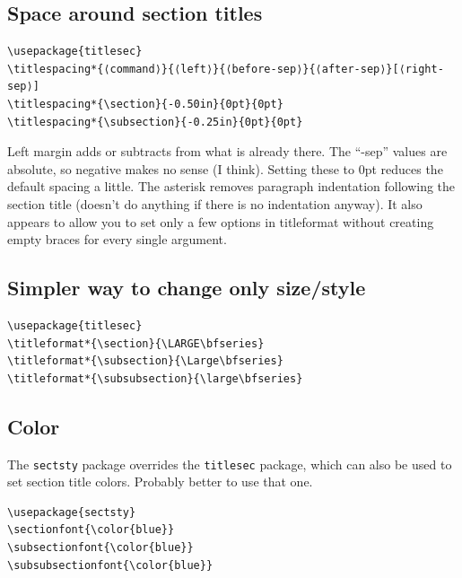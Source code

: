 \documentclass{article}
\begin{document}
\subsection{Space around section titles}
\begin{minipage}[t]{\textwidth}
\begin{lstlisting}
\usepackage{titlesec}
\titlespacing*{⟨command⟩}{⟨left⟩}{⟨before-sep⟩}{⟨after-sep⟩}[⟨right-sep⟩]
\titlespacing*{\section}{-0.50in}{0pt}{0pt}
\titlespacing*{\subsection}{-0.25in}{0pt}{0pt}
\end{lstlisting}
\end{minipage}
\begin{minipage}[t]{\textwidth}
    Left margin adds or subtracts from what is already there. The ``-sep'' values
    are absolute, so negative makes no sense (I think). Setting these to 0pt
    reduces the default spacing a little. The asterisk removes paragraph
    indentation following the section title (doesn't do anything if there
    is no indentation anyway). It also appears to allow you to set only a few options
    in titleformat without creating empty braces for every single argument.
\end{minipage}

\subsection{Simpler way to change only size/style}
\begin{lstlisting}
\usepackage{titlesec}
\titleformat*{\section}{\LARGE\bfseries}
\titleformat*{\subsection}{\Large\bfseries}
\titleformat*{\subsubsection}{\large\bfseries}
\end{lstlisting}

\subsection{Color}
The \verb|sectsty| package overrides the \verb|titlesec| package, which can
also be used to set section title colors. Probably better to use that one.
\begin{lstlisting}
\usepackage{sectsty}
\sectionfont{\color{blue}}
\subsectionfont{\color{blue}}
\subsubsectionfont{\color{blue}}
\end{lstlisting}
\end{document}
